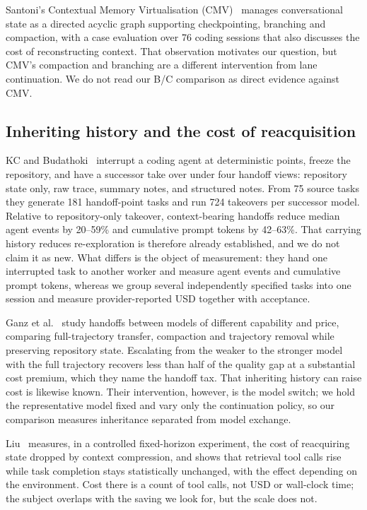 \documentclass[a4paper,11pt]{article}
\begin{document}
Santoni's Contextual Memory Virtualisation (CMV)~\cite{cmv} manages conversational state as a directed acyclic graph supporting checkpointing, branching and compaction, with a case evaluation over 76 coding sessions that also discusses the cost of reconstructing context. That observation motivates our question, but CMV's compaction and branching are a different intervention from lane continuation. We do not read our B/C comparison as direct evidence against CMV.

\subsection{Inheriting history and the cost of reacquisition}
KC and Budathoki~\cite{handoffdebt} interrupt a coding agent at deterministic points, freeze the repository, and have a successor take over under four handoff views: repository state only, raw trace, summary notes, and structured notes. From 75 source tasks they generate 181 handoff-point tasks and run 724 takeovers per successor model. Relative to repository-only takeover, context-bearing handoffs reduce median agent events by 20--59\% and cumulative prompt tokens by 42--63\%. That carrying history reduces re-exploration is therefore already established, and we do not claim it as new. What differs is the object of measurement: they hand one interrupted task to another worker and measure agent events and cumulative prompt tokens, whereas we group several independently specified tasks into one session and measure provider-reported USD together with acceptance.

Ganz et al.~\cite{handofftax} study handoffs between models of different capability and price, comparing full-trajectory transfer, compaction and trajectory removal while preserving repository state. Escalating from the weaker to the stronger model with the full trajectory recovers less than half of the quality gap at a substantial cost premium, which they name the handoff tax. That inheriting history can raise cost is likewise known. Their intervention, however, is the model switch; we hold the representative model fixed and vary only the continuation policy, so our comparison measures inheritance separated from model exchange.

Liu~\cite{ctxcompression} measures, in a controlled fixed-horizon experiment, the cost of reacquiring state dropped by context compression, and shows that retrieval tool calls rise while task completion stays statistically unchanged, with the effect depending on the environment. Cost there is a count of tool calls, not USD or wall-clock time; the subject overlaps with the saving we look for, but the scale does not.
\end{document}
